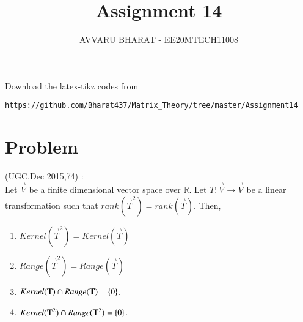 \documentclass[journal,12pt]{IEEEtran}
\begin{document}
     \def\rightbox#1{\makebox[0in][r]{#1}}
     \def\centbox#1{\makebox[0in]{#1}}
     \def\topbox#1{\raisebox{-\baselineskip}[0in][0in]{#1}}
     \def\midbox#1{\raisebox{-0.5\baselineskip}[0in][0in]{#1}}
\vspace{3cm}
\title{Assignment 14}
\author{AVVARU BHARAT - EE20MTECH11008}
\maketitle
\bigskip
\renewcommand{\thefigure}{\theenumi}
\renewcommand{\thetable}{\theenumi}
%
Download the latex-tikz codes from 
%
\begin{lstlisting}
https://github.com/Bharat437/Matrix_Theory/tree/master/Assignment14
\end{lstlisting}
\section{\textbf{Problem}}
(UGC,Dec 2015,74) : \\
%
Let $\vec{V}$ be a finite dimensional vector space over $\mathbb{R}$. Let $T:\vec{V}\rightarrow\vec{V}$ be a linear transformation such that $rank(\vec{T}^2)=rank(\vec{T})$. Then,
\begin{enumerate}
    \item $Kernel(\vec{T}^2)=Kernel(\vec{T})$
    \item $Range(\vec{T}^2)=Range(\vec{T})$
    \item $Kernel(\mathbf{T})\cap Range(\mathbf{T})=\left\{0\right\}$.
    \item $Kernel(\mathbf{T}^2)\cap Range(\mathbf{T}^2)=\left\{0\right\}$.
\end{enumerate}
\end{document}
